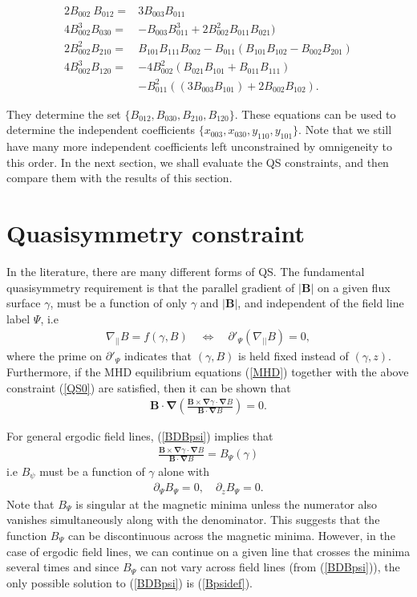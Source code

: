 \documentclass[aip,pop,reprint]{revtex4-1}
\newcommand*{\B}{\bm{B}}
\newcommand*{\dpl}{\nabla_{||}}
\newcommand*{\dl}{\bm{\nabla}}
\newcommand*{\lbr}{\left(}
\newcommand*{\rbr}{\right)}
\begin{document}
\begin{align}
 2 B_{002}\:B_{012} = &3 B_{003} B_{011} \nonumber\\
 4 B_{002}^3 B_{030} = &- B_{003} B_{011}^3 + 2 B_{002}^2 B_{011} B_{021})\label{omniB2}\\
 2 B_{002}^2 B_{210} = &B_{101} B_{111}B_{002} - B_{011} (B_{101} B_{102} -B_{002} B_{201}) \nonumber\\
 4 B_{002}^3 B_{120} = &-4 B_{002}^2( B_{021} B_{101}+ B_{011} B_{111})\nonumber\\ 
 &-B_{011}^2 ((3 B_{003} B_{101}) + 
 2 B_{002}B_{102}) .\nonumber
\end{align}

They determine the set $\{B_{012},B_{030},B_{210},B_{120}\}$. These equations can be used to determine the independent coefficients $\{x_{003},x_{030},y_{110},y_{101}\}$. Note that we still have many more independent coefficients left unconstrained by omnigeneity to this order. In the next section, we shall evaluate the QS constraints, and then compare them with the results of this section. 



 
\section{Quasisymmetry constraint}
\label{sec:QSconstraint}
In the literature, there are many different forms of QS. The fundamental quasisymmetry requirement is that the parallel gradient of $|\B|$  on a given flux surface $\gamma$, must be a function of only $\gamma$ and $|\B|$, and independent of the field line label $\Psi$, i.e
\begin{align}
\dpl B = f(\gamma, B) \quad \Leftrightarrow \quad \partial'_\Psi(\dpl B) =0,
\label{QS0}
\end{align}
where the prime on $\partial'_\Psi$ indicates that $(\gamma,B)$ is held fixed instead of $(\gamma,z)$. Furthermore, if the MHD equilibrium equations (\ref{MHD}) together with the above constraint (\ref{QS0}) are satisfied, then it can be shown \cite{helander2014theory} that
\begin{align}
\B\cdot\dl \lbr \frac{\B \times \dl \gamma \cdot \dl B}{\B\cdot \dl B}  \rbr=0.
\label{BDBpsi}
\end{align}

For general ergodic field lines, (\ref{BDBpsi}) implies that 
\begin{align}
\frac{\B \times \dl \gamma \cdot \dl B}{\B\cdot \dl B} = B_\Psi(\gamma)
\label{Bpsidef}
\end{align}
i.e $B_\psi$ must be a function of $\gamma$ alone with
\begin{align}
\partial_\Psi B_\Psi =0, \quad \partial_z B_\Psi =0.
\label{QH}
\end{align}
Note that $B_\Psi$ is singular at the magnetic minima unless the numerator also vanishes simultaneously along with the denominator. This suggests that the function $B_\Psi$ can be discontinuous across the magnetic minima. However, in the case of ergodic field lines, we can continue on a given line that crosses the minima several times and since $B_\Psi$ can not vary across field lines (from (\ref{BDBpsi})), the only possible solution to (\ref{BDBpsi}) is (\ref{Bpsidef}). 
\end{document}
